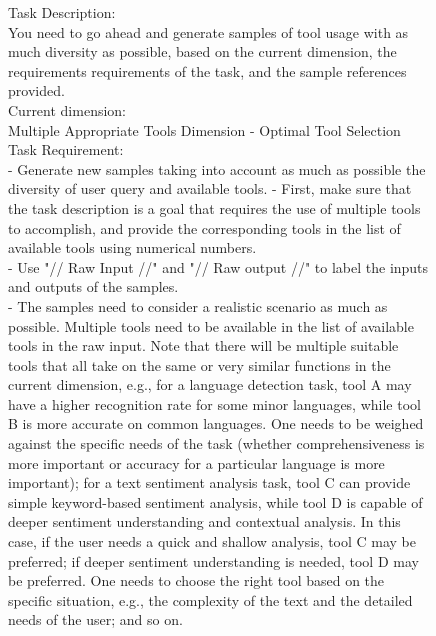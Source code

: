 \begin{figure}[!htb]
\small
\begin{tcolorbox}[
    colback=white, 
    colframe=blue3,
    boxrule=0.5mm,
    arc=0mm,
    outer arc=0mm,
    title=Limited Functionality Tools: Optimal Tool Selection - Generation Prompt
]
Task Description:\\
You need to go ahead and generate samples of tool usage with as much diversity as possible, based on the current dimension, the requirements requirements of the task, and the sample references provided.\\

Current dimension:\\
Multiple Appropriate Tools Dimension - Optimal Tool Selection\\

Task Requirement:\\
- Generate new samples taking into account as much as possible the diversity of user query and available tools.
- First, make sure that the task description is a goal that requires the use of multiple tools to accomplish, and provide the corresponding tools in the list of available tools using numerical numbers.\\
- Use "// Raw Input //" and "// Raw output //" to label the inputs and outputs of the samples.\\
- The samples need to consider a realistic scenario as much as possible. Multiple tools need to be available in the list of available tools in the raw input. Note that there will be multiple suitable tools that all take on the same or very similar functions in the current dimension, e.g., for a language detection task, tool A may have a higher recognition rate for some minor languages, while tool B is more accurate on common languages. One needs to be weighed against the specific needs of the task (whether comprehensiveness is more important or accuracy for a particular language is more important); for a text sentiment analysis task, tool C can provide simple keyword-based sentiment analysis, while tool D is capable of deeper sentiment understanding and contextual analysis. In this case, if the user needs a quick and shallow analysis, tool C may be preferred; if deeper sentiment understanding is needed, tool D may be preferred. One needs to choose the right tool based on the specific situation, e.g., the complexity of the text and the detailed needs of the user; and so on.\\


\end{tcolorbox}
\end{figure}
